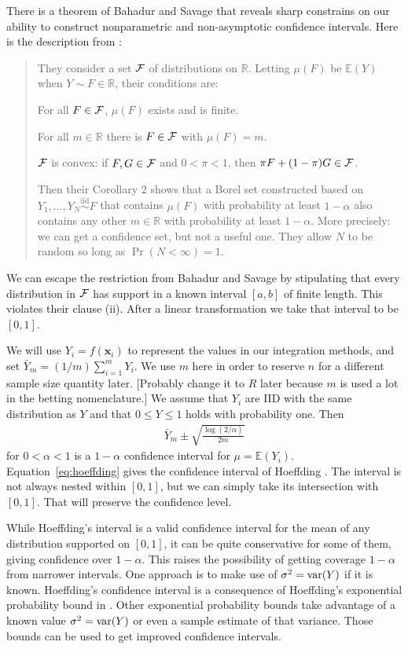 \documentclass{article}
\newcommand{\art}[1]{\begingroup\color{blue}#1\endgroup}
\renewcommand{\le}{\leqslant}
\newcommand{\real}{\mathbb{R}}
\newcommand{\e}{\mathbb{E}}
\newcommand{\bsx}{\boldsymbol{x}}
\begin{document}
There is a theorem of Bahadur and Savage \cite{BahSav56} that
reveals sharp constrains on our ability to construct
nonparametric and non-asymptotic confidence
intervals.  Here is the description from \cite{err4qmc}:
\begin{quote}They consider a set $\mathcal{F}$ of distributions on $\real$.
Letting $\mu(F)$ be $\e(Y)$ when $Y\sim F\in\real$, their conditions are:
\begin{compactenum}[\quad (i)]
\item For all $F\in\mathcal{F}$, $\mu(F)$ exists and is finite.
\item For all $m\in\real$ there is $F\in\mathcal{F}$ with $\mu(F)=m$.
\item $\mathcal{F}$ is convex: if $F,G\in\mathcal{F}$ and $0<\pi<1$,
  then $\pi F+(1-\pi)G\in \mathcal{F}$.
\end{compactenum}
Then their Corollary 2 shows that a Borel set constructed
based on $Y_1,\dots,Y_N\stackrel{\mathrm{iid}}
\sim F$
that contains $\mu(F)$ with probability at least $1-\alpha$
also contains any other $m\in\real$ with probability at least $1-\alpha$.
More precisely: we can get a confidence set, but not a useful one.
They allow $N$ to be random so long as $\Pr(N<\infty)=1$.
\end{quote}

We can escape the restriction from Bahadur and
Savage by stipulating that every distribution in $\mathcal{F}$
has support in a known interval $[a,b]$ of finite length.
This violates their clause (ii).
After a linear transformation we take that interval
to be $[0,1]$.

We will use $Y_i = f(\bsx_i)$ to represent 
the values in our integration methods, and 
set $\bar Y_m = (1/m)\sum_{i=1}^mY_i$.  
We use $m$ here in order to reserve $n$ for a
different sample size quantity later.
\art{[Probably change it to $R$ later because $m$ is
used a lot in the betting nomenclature.]}
We assume that $Y_i$ are IID with the same
distribution as $Y$ and that
$0\le Y\le1$ holds with probability one.
Then
\begin{align}\label{eq:hoeffding}
\bar Y_m \pm \sqrt{\frac{\log(2/\alpha)}{2m}}
\end{align}
for $0<\alpha<1$ is a $1-\alpha$ confidence interval for $\mu=\e(Y_i)$.  Equation~\eqref{eq:hoeffding} gives
the confidence interval of Hoeffding \cite{hoef:1963}.  The interval is not always
nested within $[0,1]$, but we can simply take its
intersection with $[0,1]$. That will preserve the confidence level.

While Hoeffding's interval is a valid confidence interval
for the mean of any distribution supported on $[0,1]$,
it can be quite conservative for some
of them, giving confidence over $1-\alpha$. This raises
the possibility of getting coverage $1-\alpha$ from
narrower intervals.  
One approach is to make use of 
$\sigma^2=\operatorname{var}(Y)$ if it is known. 
Hoeffding's confidence interval is a consequence of
Hoeffding's exponential probability bound in \cite{hoef:1963}.
Other exponential probability bounds take advantage of
a known value $\sigma^2=\operatorname{var}(Y)$ or even a sample estimate
of that variance.  Those bounds can be used to get
improved confidence intervals.
\end{document}
